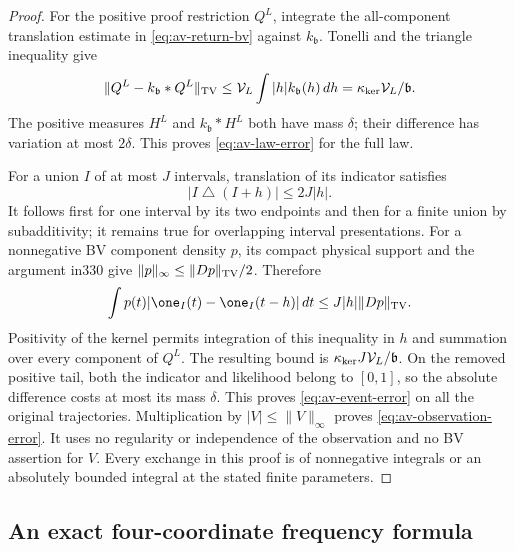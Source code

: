 \begin{proof}
For the positive proof restriction $Q^L$, integrate the all-component
translation estimate in \eqref{eq:av-return-bv} against
$k_{\mathfrak b}$.  Tonelli and the triangle inequality give
\[
 \|Q^L-k_{\mathfrak b}*Q^L\|_{\rm TV}
 \le\mathcal V_L\int|h|k_{\mathfrak b}(h)\,dh
 =\kappa_{\rm ker}\mathcal V_L/\mathfrak b.
\]
The positive measures $H^L$ and $k_{\mathfrak b}*H^L$ both have
mass $\delta$; their difference has variation at most $2\delta$.
This proves \eqref{eq:av-law-error} for the full law.

For a union $I$ of at most $J$ intervals, translation of its
indicator satisfies
\[
 |I\mathbin\triangle(I+h)|\le2J|h|.
\]
It follows first for one interval by its two endpoints and then
for a finite union by subadditivity; it remains true for overlapping
interval presentations.  For a nonnegative BV component density
$p$, its compact physical support and the argument in330 give
$\|p\|_\infty\le\|Dp\|_{\rm TV}/2$.  Therefore
\[
 \int p(t)|\one_I(t)-\one_I(t-h)|\,dt
             \le J|h|\|Dp\|_{\rm TV}.
\]
Positivity of the kernel permits integration of this inequality
in $h$ and summation over every component of $Q^L$.  The resulting
bound is $\kappa_{\rm ker}J\mathcal V_L/\mathfrak b$.
On the removed positive tail, both the indicator and likelihood
belong to $[0,1]$, so the absolute difference costs at most its
mass $\delta$.  This proves \eqref{eq:av-event-error} on all the
original trajectories.  Multiplication by $|V|\le\|V\|_\infty$
proves \eqref{eq:av-observation-error}.  It uses no regularity or
independence of the observation and no BV assertion for $V$.
Every exchange in this proof is of nonnegative integrals or an
absolutely bounded integral at the stated finite parameters.
\end{proof}

\subsection{An exact four-coordinate frequency formula}

